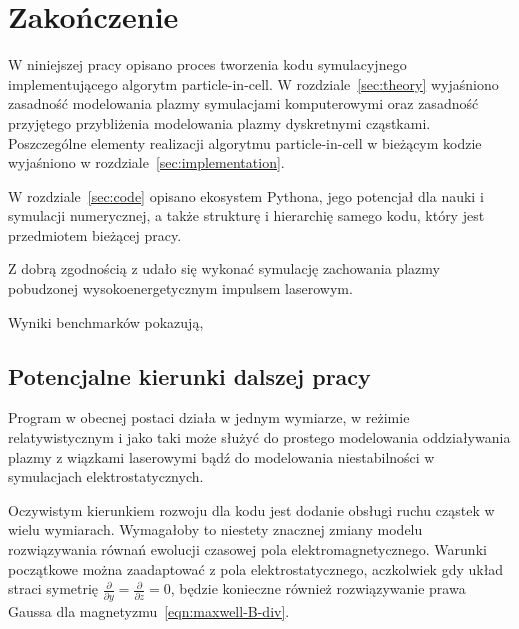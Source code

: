 \section[Zakończenie]{Zakończenie}\label{sec:ending} %

W niniejszej pracy opisano proces tworzenia kodu symulacyjnego implementującego
algorytm particle-in-cell. W rozdziale~\ref{sec:theory} wyjaśniono zasadność modelowania plazmy symulacjami komputerowymi oraz zasadność przyjętego przybliżenia
modelowania plazmy dyskretnymi cząstkami. Poszczególne elementy realizacji algorytmu particle-in-cell w bieżącym kodzie wyjaśniono w rozdziale~\ref{sec:implementation}.

W rozdziale~\ref{sec:code} opisano ekosystem Pythona, jego potencjał dla nauki i symulacji numerycznej, a także strukturę i hierarchię samego kodu, który jest przedmiotem bieżącej pracy.

Z dobrą zgodnością z  udało się wykonać symulację zachowania plazmy pobudzonej wysokoenergetycznym impulsem laserowym. %

Wyniki benchmarków pokazują,%

\subsection{Potencjalne kierunki dalszej pracy}

Program w obecnej postaci działa w jednym wymiarze, w reżimie relatywistycznym i jako taki może służyć do prostego modelowania oddziaływania plazmy z wiązkami laserowymi
bądź do modelowania niestabilności w symulacjach elektrostatycznych.

Oczywistym kierunkiem rozwoju dla kodu jest dodanie obsługi ruchu cząstek w wielu wymiarach. Wymagałoby to niestety znacznej zmiany modelu rozwiązywania równań ewolucji czasowej pola elektromagnetycznego.
Warunki początkowe można zaadaptować z pola elektrostatycznego, aczkolwiek gdy układ straci symetrię $\frac{\partial}{\partial y} = \frac{\partial}{\partial z} = 0$, będzie konieczne również rozwiązywanie
prawa Gaussa dla magnetyzmu~\ref{eqn:maxwell-B-div}.

